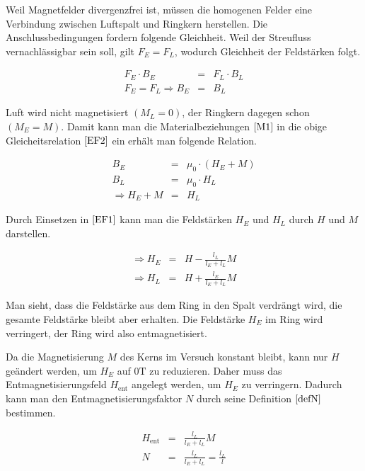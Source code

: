 \documentclass[12pt,a4paper]{scrartcl}
\numberwithin{equation}{section} %
\newcommand{\pu}[1]{\ensuremath{\mathrm{#1}}}
\renewcommand{\[}{} %
\renewcommand{\]}{\noindent} %
\begin{document}
Weil Magnetfelder divergenzfrei ist, müssen die homogenen Felder eine
Verbindung zwischen Luftspalt und Ringkern herstellen. Die
Anschlussbedingungen fordern folgende Gleichheit. Weil der Streufluss
vernachlässigbar sein soll, gilt \(F_E = F_L\), wodurch Gleichheit der
Feldstärken folgt.

\[
\begin{eqnarray}
    F_E\cdot B_E &=& F_L\cdot B_L \nonumber \\
    F_E = F_L \Rightarrow B_E &=& B_L \label{EF2}
\end{eqnarray}
\]

Luft wird nicht magnetisiert \((M_L=0)\), der Ringkern dagegen schon
\((M_E=M)\). Damit kann man die Materialbeziehungen \(\eqref{M1}\) in
die obige Gleicheitsrelation \(\eqref{EF2}\) ein erhält man folgende
Relation.

\[
\begin{eqnarray}
    B_E &=& \mu_0 \cdot \left(H_E + M\right) \nonumber \\
    B_L &=& \mu_0 \cdot H_L \nonumber \\
    \Rightarrow H_E + M &=& H_L \label{EF3}
\end{eqnarray}
\]

Durch Einsetzen in \(\eqref{EF1}\) kann man die Feldstärken \(H_E\) und
\(H_L\) durch \(H\) und \(M\) darstellen.

\[
\begin{eqnarray}
    \Rightarrow H_E &=& H - \frac{l_L}{l_E+l_L} M \\
    \Rightarrow H_L &=& H + \frac{l_E}{l_E+l_L} M
\end{eqnarray}
\]

Man sieht, dass die Feldstärke aus dem Ring in den Spalt verdrängt wird,
die gesamte Feldstärke bleibt aber erhalten. Die Feldstärke \(H_E\) im
Ring wird verringert, der Ring wird also entmagnetisiert.

Da die Magnetisierung \(M\) des Kerns im Versuch konstant bleibt, kann
nur \(H\) geändert werden, um \(H_E\) auf \(\pu{0T}\) zu reduzieren.
Daher muss das Entmagnetisierungsfeld \(H_\mathrm{ent}\) angelegt
werden, um \(H_E\) zu verringern. Dadurch kann man den
Entmagnetisierungsfaktor \(N\) durch seine Definition \(\eqref{defN}\)
bestimmen.

\[
\begin{eqnarray}
    H_\mathrm{ent} &=& \frac{l_L}{l_E+l_L} M \\
    N &=& \frac{l_L}{l_E+l_L} = \frac{l_L}{l}
\end{eqnarray}
\]
\end{document}
